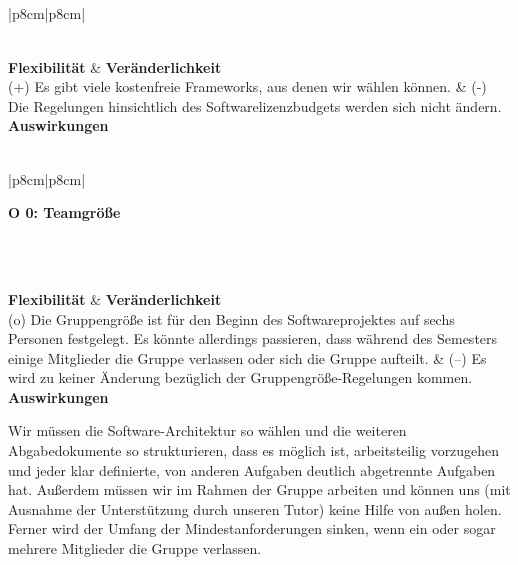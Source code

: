 \documentclass[enabledeprecatedfontcommands,fontsize=11pt,paper=a4,twoside]{scrartcl}
\newcounter{one}
\newcommand{\tone}{0\theone}
\begin{document}
\\ \\ \\ \\%
\begin{tabular} {|p{8cm}|p{8cm}|}
	\hline
	\multicolumn{2}{|l|}{\parbox{16cm} {\textbf{\hypertarget{ww}{O \tone}: Softwarelizenzbudget} }}\\ \hline \hline
	\rule{0pt}{1ex}\\\hline
	\textbf{Flexibilität}  & \textbf{Veränderlichkeit} \\
	(+) Es gibt viele kostenfreie Frameworks, aus denen wir wählen können. &
	(-) Die Regelungen hinsichtlich des Softwarelizenzbudgets werden sich nicht ändern. \\ \hline
	 {\textbf{Auswirkungen}} \\
	\\[1ex] \hline
\end{tabular}
\newpage
\hspace{-0.65cm}
\begin{tabular} {|p{8cm}|p{8cm}|}
	\hline
	 {\parbox{16cm}{\textbf{\hypertarget{xx}{O \tone}: Teamgröße}} }\\ \hline \hline
	\rule{0pt}{1ex}\\ \hline
	\textbf{Flexibilität}  & \textbf{Veränderlichkeit} \\
	(o) Die Gruppengröße ist für den Beginn des Softwareprojektes auf sechs Personen festgelegt. Es könnte allerdings passieren, dass während des Semesters einige Mitglieder die Gruppe verlassen oder sich die Gruppe aufteilt. &
	(--) Es wird zu keiner Änderung bezüglich der Gruppengröße-Regelungen kommen. \\ \hline
	 {\textbf{Auswirkungen}} \\
	 {\parbox{16cm}{Wir müssen die Software-Architektur so wählen und die weiteren Abgabedokumente so strukturieren, dass es möglich ist, arbeitsteilig vorzugehen und jeder klar definierte, von anderen Aufgaben deutlich abgetrennte Aufgaben hat. Außerdem müssen wir im Rahmen der Gruppe arbeiten und können uns (mit Ausnahme der Unterstützung durch unseren Tutor) keine Hilfe von außen holen. Ferner wird der Umfang der Mindestanforderungen sinken, wenn ein oder sogar mehrere Mitglieder die Gruppe verlassen. }}\\ \hline
\end{tabular}\newpage
\newpage
\end{document}
